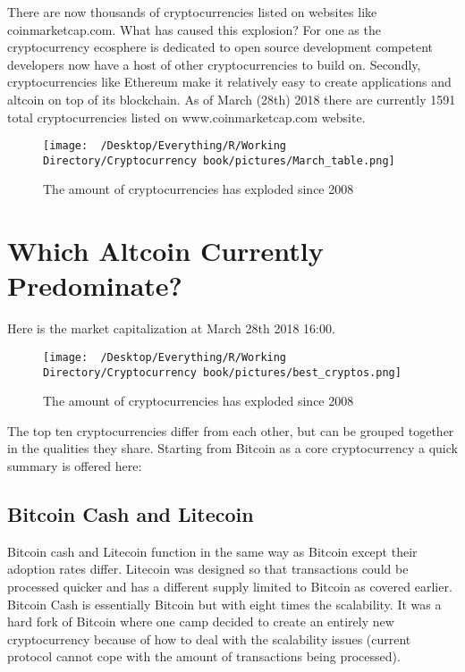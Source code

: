 \documentclass[]{book}
\theoremstyle{definition}
\theoremstyle{definition}
\theoremstyle{definition}
\theoremstyle{remark}
\begin{document}
There are now thousands of cryptocurrencies listed on websites like
coinmarketcap.com. What has caused this explosion? For one as the
cryptocurrency ecosphere is dedicated to open source development
competent developers now have a host of other cryptocurrencies to build
on. Secondly, cryptocurrencies like Ethereum make it relatively easy to
create applications and altcoin on top of its blockchain. As of March
(28th) 2018 there are currently 1591 total cryptocurrencies listed on
www.coinmarketcap.com website.

\begin{figure}[htbp]
\centering
\texttt{[image: ~/Desktop/Everything/R/Working Directory/Cryptocurrency book/pictures/March\_table.png]}
\caption{The amount of cryptocurrencies has exploded since 2008}
\end{figure}

\section{Which Altcoin Currently
Predominate?}\label{which-altcoin-currently-predominate}

Here is the market capitalization at March 28th 2018 16:00.

\begin{figure}[htbp]
\centering
\texttt{[image: ~/Desktop/Everything/R/Working Directory/Cryptocurrency book/pictures/best\_cryptos.png]}
\caption{The amount of cryptocurrencies has exploded since 2008}
\end{figure}

The top ten cryptocurrencies differ from each other, but can be grouped
together in the qualities they share. Starting from Bitcoin as a core
cryptocurrency a quick summary is offered here:

\subsection{Bitcoin Cash and Litecoin}\label{bitcoin-cash-and-litecoin}

Bitcoin cash and Litecoin function in the same way as Bitcoin except
their adoption rates differ. Litecoin was designed so that transactions
could be processed quicker and has a different supply limited to Bitcoin
as covered earlier. Bitcoin Cash is essentially Bitcoin but with eight
times the scalability. It was a hard fork of Bitcoin where one camp
decided to create an entirely new cryptocurrency because of how to deal
with the scalability issues (current protocol cannot cope with the
amount of transactions being processed).
\end{document}
